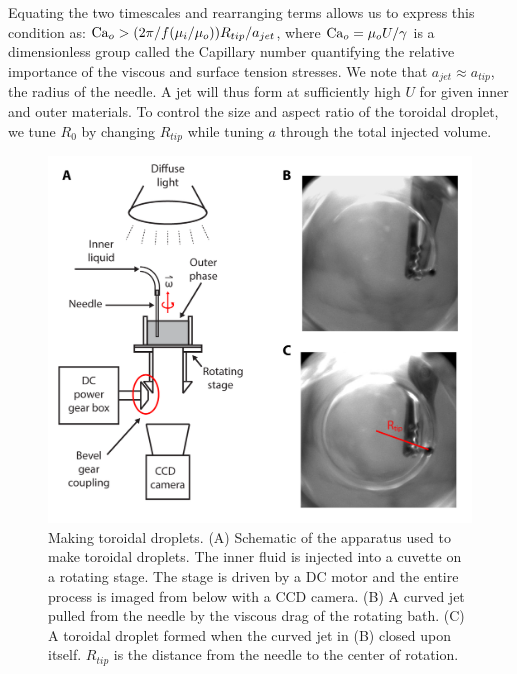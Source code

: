 Equating the two timescales and rearranging terms allows us to express this condition as: $\textup{Ca}_o > (2 \pi / f(\mu_i/\mu_o))R_{tip}/a_{jet}$, where $\textup{Ca}_o = \mu_o U/\gamma$ is a dimensionless group called the Capillary number quantifying the relative importance of the viscous and surface tension stresses.
We note that $a_{jet} \approx a_{tip}$, the radius of the needle.
A jet will thus form at sufficiently high $U$ for given inner and outer materials.
To control the size and aspect ratio of the toroidal droplet, we tune $R_0$ by changing $R_{tip}$ while tuning $a$ through the total injected volume.
\begin{figure}
  \centering
  \includegraphics{figures/C3/Ch3-Figs_MakeTorus.png}
  \caption{Making toroidal droplets.
  (A) Schematic of the apparatus used to make toroidal droplets.
  The inner fluid is injected into a cuvette on a rotating stage.
  The stage is driven by a DC motor and the entire process is imaged from below with a CCD camera.
  (B) A curved jet pulled from the needle by the viscous drag of the rotating bath.
  (C) A toroidal droplet formed when the curved jet in (B) closed upon itself.
  $R_{tip}$ is the distance from the needle to the center of rotation.}\label{f:3-MakeTorus}
\end{figure}

